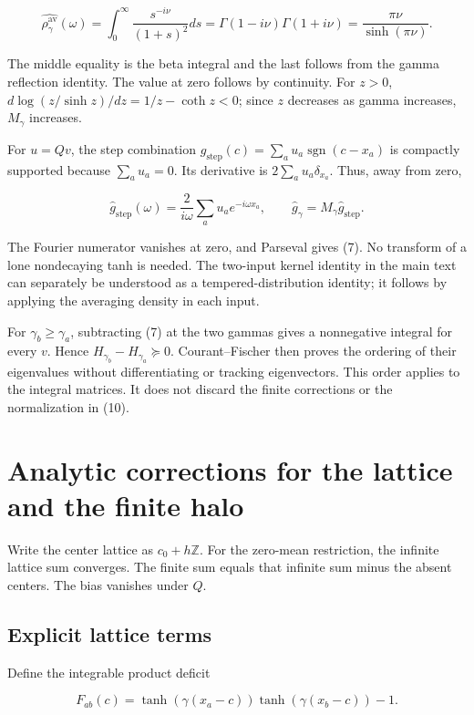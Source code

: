\documentclass[11pt]{article}
\begin{document}
\[
\widehat{\rho_\gamma^{\mathrm{av}}}(\omega)
=\int_0^\infty\frac{s^{-i\nu}}{(1+s)^2}ds
=\Gamma(1-i\nu)\Gamma(1+i\nu)
=\frac{\pi\nu}{\sinh(\pi\nu)}.
\]

The middle equality is the beta integral and the last follows from the gamma reflection identity. The value at zero follows by continuity. For \(z>0\), \(d\log(z/\sinh z)/dz=1/z-\coth z<0\); since \(z\) decreases as gamma increases, \(M_\gamma\) increases.

For \(u=Qv\), the step combination \(g_{\mathrm{step}}(c)=\sum_a u_a\operatorname{sgn}(c-x_a)\) is compactly supported because \(\sum_a u_a=0\). Its derivative is \(2\sum_a u_a\delta_{x_a}\). Thus, away from zero,

\[
\widehat g_{\mathrm{step}}(\omega)
=\frac{2}{i\omega}\sum_a u_a e^{-i\omega x_a},
\qquad
\widehat g_\gamma=M_\gamma\widehat g_{\mathrm{step}}.
\]

The Fourier numerator vanishes at zero, and Parseval gives (7). No transform of a lone nondecaying tanh is needed. The two-input kernel identity in the main text can separately be understood as a tempered-distribution identity; it follows by applying the averaging density in each input.

For \(\gamma_b\ge\gamma_a\), subtracting (7) at the two gammas gives a nonnegative integral for every \(v\). Hence \(H_{\gamma_b}-H_{\gamma_a}\succeq0\). Courant--Fischer then proves the ordering of their eigenvalues without differentiating or tracking eigenvectors. This order applies to the integral matrices. It does not discard the finite corrections or the normalization in (10).

\section{Analytic corrections for the lattice and the finite halo}

Write the center lattice as \(c_0+h\mathbb Z\). For the zero-mean restriction, the infinite lattice sum converges. The finite sum equals that infinite sum minus the absent centers. The bias vanishes under \(Q\).

\subsection{Explicit lattice terms}

Define the integrable product deficit

\[
F_{ab}(c)=\tanh(\gamma(x_a-c))\tanh(\gamma(x_b-c))-1.
\]
\end{document}
